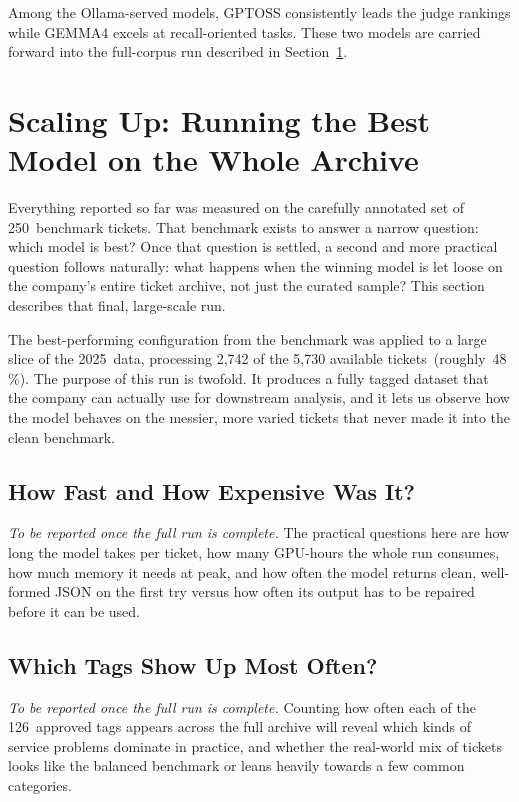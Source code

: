 Among the Ollama-served models, GPTOSS consistently leads the judge rankings
while GEMMA4 excels at recall-oriented tasks.  These two models are carried
forward into the full-corpus run described in Section~\ref{sec:res-fullrun}.

\section{Scaling Up: Running the Best Model on the Whole Archive}
\label{sec:res-fullrun}
%
Everything reported so far was measured on the carefully annotated set of
250~benchmark tickets.  That benchmark exists to answer a narrow question:
which model is best?  Once that question is settled, a second and more practical
question follows naturally: what happens when the winning model is let loose on
the company's entire ticket archive, not just the curated sample?  This section
describes that final, large-scale run.

The best-performing configuration from the benchmark was applied to a large
slice of the 2025~data, processing 2{,}742 of the 5{,}730 available
tickets~(roughly~48\,\%).  The purpose of this run is twofold.  It produces a
fully tagged dataset that the company can actually use for downstream analysis,
and it lets us observe how the model behaves on the messier, more varied tickets
that never made it into the clean benchmark.

\subsection{How Fast and How Expensive Was It?}
%
\textit{To be reported once the full run is complete.}  The practical questions
here are how long the model takes per ticket, how many GPU-hours the whole run
consumes, how much memory it needs at peak, and how often the model returns
clean, well-formed JSON on the first try versus how often its output has to be
repaired before it can be used.

\subsection{Which Tags Show Up Most Often?}
%
\textit{To be reported once the full run is complete.}  Counting how often each
of the 126~approved tags appears across the full archive will reveal which kinds
of service problems dominate in practice, and whether the real-world mix of
tickets looks like the balanced benchmark or leans heavily towards a few common
categories.

